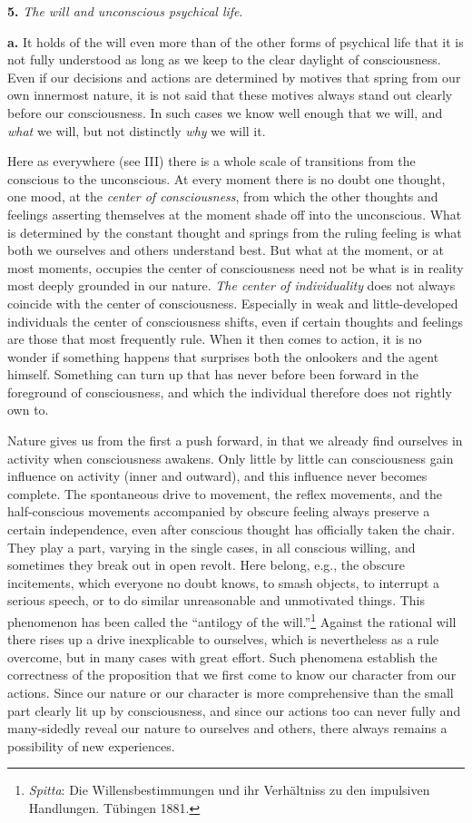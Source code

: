 \documentclass[12pt,a4paper]{book}
\newcommand{\opage}[1]{\marginnote{\footnotesize\textit{[#1]}}}
\begin{document}
\textbf{5.} \emph{The will and unconscious psychical life}.

\textbf{a.} It holds of the will even more than of the other forms of
psychical life that it is not fully understood as long as we keep to the
clear daylight of consciousness. Even if our decisions and actions are
determined by motives that spring from our own innermost nature, it is not
said that these motives always stand out clearly before our consciousness.
In such cases we know well enough that we will, and \emph{what} we will,
but not distinctly \emph{why} we will it.

Here as everywhere (see III) there is a whole scale of transitions from
the conscious to the unconscious. At every moment there is no doubt one
thought, one mood, at the
\opage{398}\emph{center of consciousness}, from which the other thoughts
and feelings asserting themselves at the moment shade off into the
unconscious. What is determined by the constant thought and springs from
the ruling feeling is what both we ourselves and others understand best.
But what at the moment, or at most moments, occupies the center of
consciousness need not be what is in reality most deeply grounded in our
nature. \emph{The center of individuality} does not always coincide with
the center of consciousness. Especially in weak and little-developed
individuals the center of consciousness shifts, even if certain thoughts
and feelings are those that most frequently rule. When it then comes to
action, it is no wonder if something happens that surprises both the
onlookers and the agent himself. Something can turn up that has never
before been forward in the foreground of consciousness, and which the
individual therefore does not rightly own to.

Nature gives us from the first a push forward, in that we already find
ourselves in activity when consciousness awakens. Only little by little
can consciousness gain influence on activity (inner and outward), and this
influence never becomes complete. The spontaneous drive to movement, the
reflex movements, and the half-conscious movements accompanied by obscure
feeling always preserve a certain independence, even after conscious
thought has officially taken the chair. They play a part, varying in the
single cases, in all conscious willing, and sometimes they break out in
open revolt. Here belong, e.g., the obscure incitements, which everyone
no doubt knows, to smash objects, to interrupt a serious speech, or to do
similar unreasonable and unmotivated things. This phenomenon has been
called the ``antilogy of the
will.''\footnote{\emph{Spitta}: Die Willensbestimmungen und ihr
Verhältniss zu den impulsiven Handlungen. Tübingen 1881.} Against the
rational will there rises up a drive inexplicable to ourselves, which is
nevertheless as a rule overcome, but in many cases with great effort. Such
phenomena establish the correctness of the proposition that we first come
to know our character from our actions. Since our nature or our character
is more comprehensive than the small part clearly lit up by
consciousness, and since our actions too can never fully and
\opage{399}many-sidedly reveal our nature to ourselves and others, there
always remains a possibility of new experiences.
\end{document}
